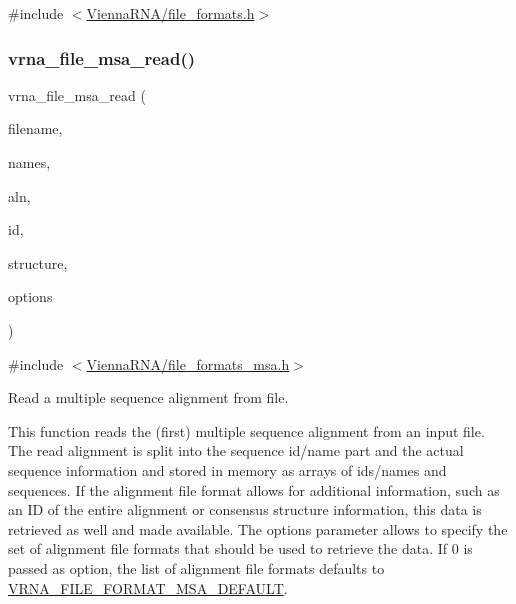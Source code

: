 {\ttfamily \#include $<$\mbox{\hyperlink{file__formats_8h}{Vienna\+R\+N\+A/file\+\_\+formats.\+h}}$>$}

\mbox{\label{group__file__utils_ga08a01c40ac5f5e0e04e9ae2258c99aa6}} 
\subsubsection{\texorpdfstring{vrna\+\_\+file\+\_\+msa\+\_\+read()}{vrna\_file\_msa\_read()}}
{\footnotesize\ttfamily vrna\+\_\+file\+\_\+msa\+\_\+read (\begin{DoxyParamCaption}\item[{const char $\ast$}]{filename,  }\item[{char $\ast$$\ast$$\ast$}]{names,  }\item[{char $\ast$$\ast$$\ast$}]{aln,  }\item[{char $\ast$$\ast$}]{id,  }\item[{char $\ast$$\ast$}]{structure,  }\item[{unsigned int}]{options }\end{DoxyParamCaption})}



{\ttfamily \#include $<$\mbox{\hyperlink{file__formats__msa_8h}{Vienna\+R\+N\+A/file\+\_\+formats\+\_\+msa.\+h}}$>$}



Read a multiple sequence alignment from file. 

This function reads the (first) multiple sequence alignment from an input file. The read alignment is split into the sequence id/name part and the actual sequence information and stored in memory as arrays of ids/names and sequences. If the alignment file format allows for additional information, such as an ID of the entire alignment or consensus structure information, this data is retrieved as well and made available. The {\ttfamily options} parameter allows to specify the set of alignment file formats that should be used to retrieve the data. If 0 is passed as option, the list of alignment file formats defaults to \mbox{\hyperlink{group__file__utils_ga4acc255373831856a8417b68de8a94c0}{V\+R\+N\+A\+\_\+\+F\+I\+L\+E\+\_\+\+F\+O\+R\+M\+A\+T\+\_\+\+M\+S\+A\+\_\+\+D\+E\+F\+A\+U\+LT}}.

